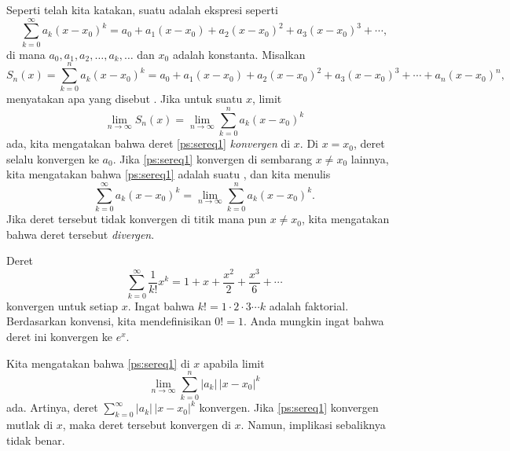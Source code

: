Seperti telah kita katakan, suatu \emph{} adalah ekspresi seperti
\begin{equation} \label{ps:sereq1}
\sum_{k=0}^\infty a_k {(x-x_0)}^k =
a_0 + 
a_1 (x-x_0) +
a_2 {(x-x_0)}^2 +
a_3 {(x-x_0)}^3 + \cdots,
\end{equation}
di mana $a_0,a_1,a_2,\ldots,a_k,\ldots$ dan $x_0$ adalah konstanta. Misalkan
\begin{equation*}
S_n(x)
=
\sum_{k=0}^n a_k {(x-x_0)}^k
=
a_0 + a_1 (x-x_0) + a_2 {(x-x_0)}^2 + a_3 {(x-x_0)}^3 + \cdots + a_n {(x-x_0)}^n ,
\end{equation*}
menyatakan apa yang disebut \emph{}. Jika untuk suatu $x$,
limit
\begin{equation*}
\lim_{n\to \infty} S_n(x) = \lim_{n\to\infty} \sum_{k=0}^n a_k {(x-x_0)}^k
\end{equation*}
ada, kita mengatakan bahwa deret \eqref{ps:sereq1}
\emph{konvergen} di $x$.
Di $x=x_0$, deret selalu konvergen ke $a_0$.
Jika \eqref{ps:sereq1}
konvergen di sembarang $x \neq x_0$ lainnya,
kita mengatakan bahwa \eqref{ps:sereq1} adalah suatu
\emph{}, dan kita menulis
\begin{equation*}
\sum_{k=0}^\infty a_k {(x-x_0)}^k = 
\lim_{n\to\infty} \sum_{k=0}^n a_k {(x-x_0)}^k.
\end{equation*}
Jika deret tersebut tidak konvergen di titik mana pun $x \neq x_0$, kita mengatakan bahwa
deret tersebut \emph{divergen}.

\begin{example} \label{ps:expex}
Deret
\begin{equation*}
\sum_{k=0}^\infty \frac{1}{k!} x^k = 
1 + x + \frac{x^2}{2} + \frac{x^3}{6} + \cdots
\end{equation*}
konvergen untuk setiap $x$.
Ingat bahwa $k! = 1\cdot 2\cdot 3 \cdots k$ adalah
faktorial. Berdasarkan konvensi, kita mendefinisikan $0! = 1$.
Anda mungkin ingat bahwa deret ini
konvergen ke $e^x$.
\end{example}

Kita mengatakan bahwa \eqref{ps:sereq1}
\emph{}
di $x$ apabila limit
\begin{equation*}
\lim_{n\to\infty} \sum_{k=0}^n
\lvert a_k \rvert \, {\lvert x-x_0 \rvert}^k 
\end{equation*}
ada. Artinya, deret
$\sum_{k=0}^\infty \lvert a_k \rvert \, {\lvert x-x_0 \rvert}^k$
konvergen.
Jika \eqref{ps:sereq1} konvergen mutlak di $x$, maka deret tersebut
konvergen di $x$. Namun, implikasi sebaliknya tidak benar.


